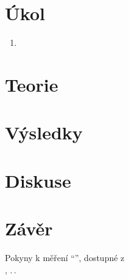 \documentclass{scirep}
\begin{document}
    \section*{Úkol}

    \begin{enumerate}

        \item

    \end{enumerate}

    \section*{Teorie}

    \section*{Výsledky}

    \section*{Diskuse}

    \section*{Závěr}

    \begin{thebibliography}{}

        Pokyny k měření ``'', dostupné z\\ \url{}, .\,.\,

    \end{thebibliography}
\end{document}
